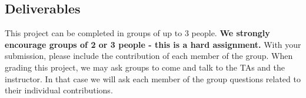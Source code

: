 \documentclass{comp450}
\begin{document}
\begin{itemize*}
\end{itemize*}

\subsection*{Deliverables}
This project can be completed in groups of up to 3 people. {\bf We strongly encourage groups of 2 or 3 people - this is a hard assignment.} With your submission, please include the contribution of each member of the group.  When grading this project,
we may ask groups to come and talk to the TAs and the instructor. In that case we will ask each member of the group questions related to their individual contributions.



\end{document}
